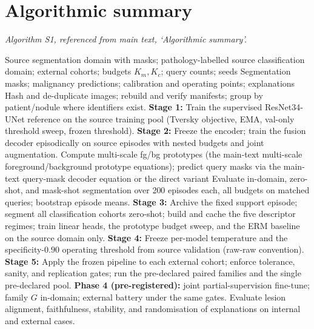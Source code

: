 \documentclass[11pt]{article}
\begin{document}
\section{Algorithmic summary}\label{sm:algorithm}

\noindent\emph{Algorithm S1, referenced from main text, `Algorithmic summary'.}

\begin{algorithm}[!ht]
\caption{Lesion-Grounded Few-Shot Segmentation--Classification Framework}
\label{alg:lgpm}
\begin{algorithmic}[1]
\Require Source segmentation domain with masks; pathology-labelled source
classification domain; external cohorts; budgets $K_m,K_c$; query counts;
seeds
\Ensure Segmentation masks; malignancy predictions; calibration and
operating points; explanations
\State Hash and de-duplicate images; rebuild and verify manifests; group by
patient/nodule where identifiers exist.
\State \textbf{Stage 1:} Train the supervised ResNet34-UNet reference on the
source training pool (Tversky objective, EMA, val-only threshold sweep,
frozen threshold).
\State \textbf{Stage 2:} Freeze the encoder; train the fusion decoder
episodically on source episodes with nested budgets and joint augmentation.
\State Compute multi-scale fg/bg prototypes
(the main-text multi-scale foreground/background prototype equations);
predict query masks via the main-text query-mask decoder equation or the direct variant
\State Evaluate in-domain, zero-shot, and mask-shot segmentation over 200
episodes each, all budgets on matched queries; bootstrap episode means.
\State \textbf{Stage 3:} Archive the fixed support episode; segment all
classification cohorts zero-shot; build and cache the five descriptor
regimes; train linear heads, the prototype budget sweep, and the ERM
baseline on the source domain only.
\State \textbf{Stage 4:} Freeze per-model temperature and the
specificity-$0.90$ operating threshold from source validation (raw-raw
convention).
\State \textbf{Stage 5:} Apply the frozen pipeline to each external cohort;
enforce tolerance, sanity, and replication gates; run the pre-declared
paired families and the single pre-declared pool.
\State \textbf{Phase 4 (pre-registered):} joint partial-supervision
fine-tune; family $G$ in-domain; external battery under the same gates.
\State Evaluate lesion alignment, faithfulness, stability, and randomisation
of explanations on internal and external cases.
\end{algorithmic}
\end{algorithm}
\end{document}
